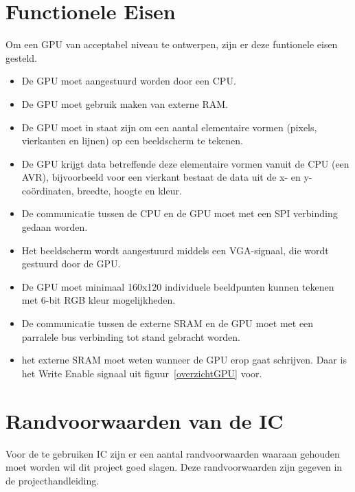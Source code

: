 \documentclass{scrartcl} %
\begin{document}
\section {Functionele Eisen}
Om een GPU van acceptabel niveau te ontwerpen, zijn er deze funtionele eisen gesteld.
\begin {itemize}
\item De GPU moet aangestuurd worden door een CPU.
\item De GPU moet gebruik maken van externe RAM.
\item De GPU moet in staat zijn om een aantal elementaire vormen (pixels, vierkanten en lijnen) op een beeldscherm te tekenen.
\item De GPU krijgt data betreffende deze elementaire vormen vanuit de CPU (een AVR), bijvoorbeeld voor een vierkant bestaat de data uit de x- en y-coördinaten, breedte, hoogte en kleur.
\item De communicatie tussen de CPU en de GPU moet met een SPI verbinding gedaan worden.
\item Het beeldscherm wordt aangestuurd middels een VGA-signaal, die wordt gestuurd door de GPU.
\item De GPU moet minimaal 160x120 individuele beeldpunten kunnen tekenen met 6-bit RGB kleur mogelijkheden.
\item De communicatie tussen de externe SRAM en de GPU moet met een parralele bus verbinding tot stand gebracht worden.
\item het externe SRAM moet weten wanneer de GPU erop gaat schrijven. Daar is het Write Enable signaal uit figuur~\ref{overzichtGPU} voor.
\end{itemize}

\section {Randvoorwaarden van de IC}

Voor de te gebruiken IC zijn er een aantal randvoorwaarden waaraan gehouden moet worden wil dit project goed slagen. Deze randvoorwaarden zijn gegeven in de projecthandleiding\cite {epo3-manual}.
\end{document}
